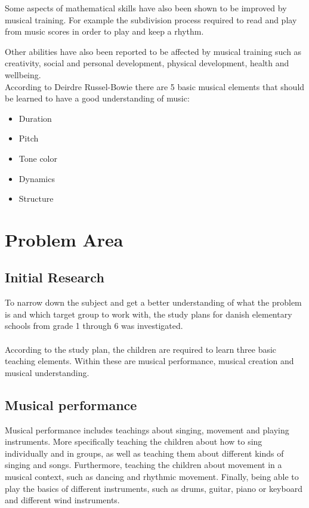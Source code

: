 Some aspects of mathematical skills have also been shown to be improved by musical training. For example the subdivision process required to read and play from music scores in order to play and keep a rhythm\cite{powerOfMusic}.

Other abilities have also been reported to be affected by musical training such as creativity, social and personal development, physical development, health and wellbeing\cite{powerOfMusic}.\\

According to Deirdre Russel-Bowie there are 5 basic musical elements that should be learned to have a good understanding of music\cite{interactiveMusicVideoGames}:
\begin{itemize}\label{list:basicMusic}
	\item Duration
	\item Pitch
	\item Tone color
	\item Dynamics
	\item Structure
\end{itemize}

\section{Problem Area}

	\subsection{Initial Research}
	To narrow down the subject and get a better understanding of what the problem is and which target group to work with, the study plans for danish elementary schools from grade 1 through 6 was investigated.\\
	\\
	According to the study plan, the children are required to learn three basic teaching elements. Within these are musical performance, musical creation and musical understanding.
	
	\subsection*{Musical performance}
	Musical performance includes teachings about singing, movement and playing instruments. More specifically teaching the children about how to sing individually and in groups, as well as teaching them about different kinds of singing and songs. Furthermore, teaching the children about movement in a musical context, such as dancing and rhythmic movement. Finally, being able to play the basics of different instruments, such as drums, guitar, piano or keyboard and different wind instruments.
	
